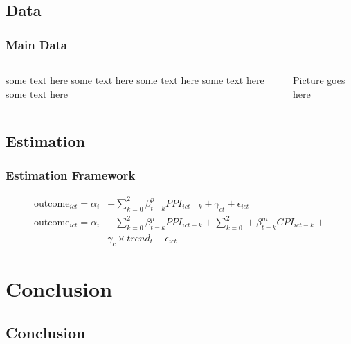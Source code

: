 \documentclass[11pt, aspectratio=169]{beamer}
\begin{document}
\subsection{Data}
\begin{frame}[label=data_slide]\frametitle{Main Data}

\begin{columns}
\begin{column}{0.6\textwidth}
\begin{wideitemize}
   \item some text here some text here some text here some text here
   some text here
   \item \hyperlink{appendix_end}{}
\end{wideitemize}
\end{column}
\begin{column}{0.4\textwidth}
    \begin{center}
    Picture goes here
     \end{center}
\end{column}
\end{columns}
\end{frame}
\subsection{Estimation}
\begin{frame}\frametitle{Estimation Framework}
\begin{align*}
\text{outcome}_{ict} = \alpha_i & + \sum_{k=0}^2 \beta_{t-k}^p
PPI_{ict-k} + \gamma_{ct} + \epsilon_{ict} \\
\text{outcome}_{ict} = \alpha_i & + \sum_{k=0}^2 \beta_{t-k}^p PPI_{ict-k} +
\sum_{k=0}^2 + \beta_{t-k}^m CPI_{ict-k} + \\ & \gamma_{c}\times
trend_t + \epsilon_{ict}
\end{align*}
\end{frame}
\section{Conclusion}
\subsection{Conclusion}
\end{document}
